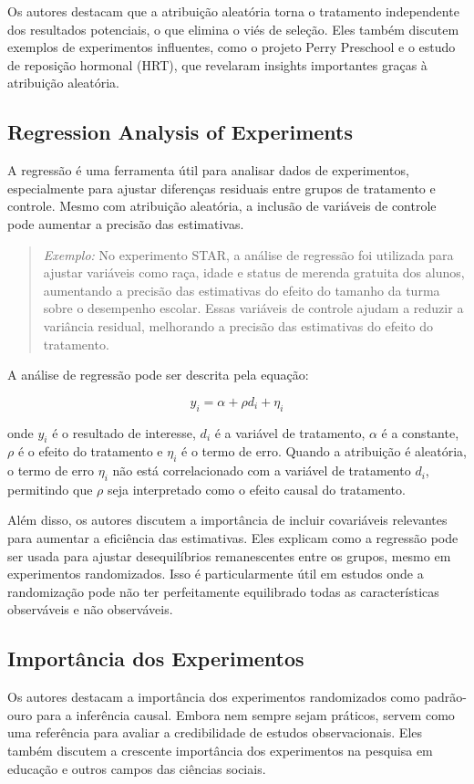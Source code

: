 \documentclass[a4paper,12pt]{article}[abntex2]
\begin{document}
Os autores destacam que a atribuição aleatória torna o tratamento independente dos resultados potenciais, o que elimina o viés de seleção. Eles também discutem exemplos de experimentos influentes, como o projeto Perry Preschool e o estudo de reposição hormonal (HRT), que revelaram insights importantes graças à atribuição aleatória.

\subsection{Regression Analysis of Experiments}
A regressão é uma ferramenta útil para analisar dados de experimentos, especialmente para ajustar diferenças residuais entre grupos de tratamento e controle. Mesmo com atribuição aleatória, a inclusão de variáveis de controle pode aumentar a precisão das estimativas.

\begin{quote}
\textit{Exemplo:} No experimento STAR, a análise de regressão foi utilizada para ajustar variáveis como raça, idade e status de merenda gratuita dos alunos, aumentando a precisão das estimativas do efeito do tamanho da turma sobre o desempenho escolar. Essas variáveis de controle ajudam a reduzir a variância residual, melhorando a precisão das estimativas do efeito do tratamento.
\end{quote}

A análise de regressão pode ser descrita pela equação:

\[ y_i = \alpha + \rho d_i + \eta_i \]

onde \( y_i \) é o resultado de interesse, \( d_i \) é a variável de tratamento, \( \alpha \) é a constante, \( \rho \) é o efeito do tratamento e \( \eta_i \) é o termo de erro. Quando a atribuição é aleatória, o termo de erro \( \eta_i \) não está correlacionado com a variável de tratamento \( d_i \), permitindo que \( \rho \) seja interpretado como o efeito causal do tratamento.

Além disso, os autores discutem a importância de incluir covariáveis relevantes para aumentar a eficiência das estimativas. Eles explicam como a regressão pode ser usada para ajustar desequilíbrios remanescentes entre os grupos, mesmo em experimentos randomizados. Isso é particularmente útil em estudos onde a randomização pode não ter perfeitamente equilibrado todas as características observáveis e não observáveis.

\subsection{Importância dos Experimentos}
Os autores destacam a importância dos experimentos randomizados como padrão-ouro para a inferência causal. Embora nem sempre sejam práticos, servem como uma referência para avaliar a credibilidade de estudos observacionais. Eles também discutem a crescente importância dos experimentos na pesquisa em educação e outros campos das ciências sociais.
\end{document}
